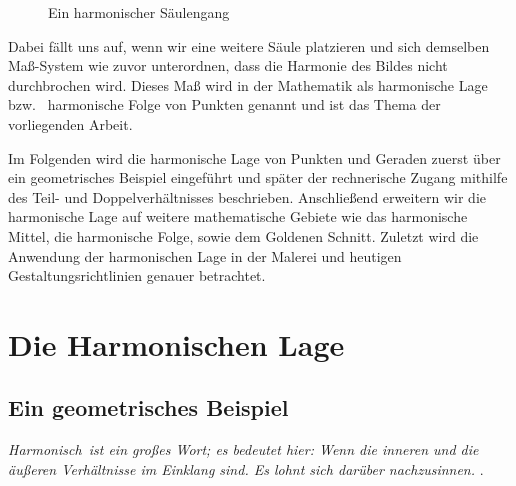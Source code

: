 \documentclass[12pt,a4paper]{article}
\begin{document}
\begin{figure}[htbp]
 \hfill
{}
\caption[asdf]{Ein harmonischer Säulengang}
\label{fig:saeulen}
\end{figure}

Dabei fällt uns auf, wenn wir eine weitere Säule platzieren und sich demselben Maß-System wie zuvor unterordnen, dass die Harmonie des Bildes nicht durchbrochen wird. Dieses Maß wird in der Mathematik als harmonische Lage bzw.~ harmonische Folge von Punkten genannt und ist das Thema der vorliegenden Arbeit.

Im Folgenden wird die harmonische Lage von Punkten und Geraden zuerst über ein geometrisches Beispiel eingeführt und später der rechnerische Zugang mithilfe des Teil- und Doppelverhältnisses beschrieben. Anschließend erweitern wir die harmonische Lage auf weitere mathematische Gebiete wie das harmonische Mittel, die harmonische Folge, sowie dem Goldenen Schnitt. Zuletzt wird die Anwendung der harmonischen Lage in der Malerei und heutigen Gestaltungsrichtlinien genauer betrachtet.

\newpage
\section{Die Harmonischen Lage}
\label{subsec:dieHarmonischeLage}

\subsection{Ein geometrisches Beispiel}
\textit{\glqq Harmonisch\grqq ~ist ein großes Wort; es bedeutet hier: Wenn die inneren und die äußeren Verhältnisse im Einklang sind. Es lohnt sich darüber nachzusinnen.} \citep[S.~53]{projektiveGeometrie}.
\end{document}
